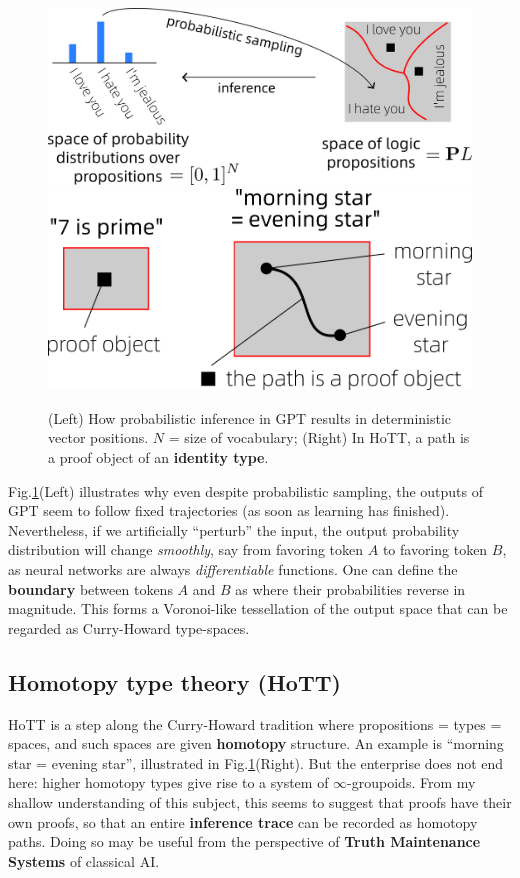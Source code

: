 \documentclass[runningheads]{llncs}
\begin{document}
\begin{figure}
	\includegraphics[scale=.45]{Transformer-output.png} \quad
	\includegraphics[scale=.35]{morning-star.png}
	\caption{(Left) How probabilistic inference in GPT results in deterministic vector positions. $N$ = size of vocabulary; (Right) In HoTT, a path is a proof object of an \textbf{identity type}.}
	\label{fig:morning-star}
\end{figure}

Fig.\ref{fig:morning-star}(Left) illustrates why even despite probabilistic sampling, the outputs of GPT seem to follow fixed trajectories (as soon as learning has finished).  Nevertheless, if we artificially ``perturb'' the input, the output probability distribution will change \textit{smoothly}, say from favoring token $A$ to favoring token $B$, as neural networks are always \textit{differentiable} functions.  One can define the \textbf{boundary} between tokens $A$ and $B$ as where their probabilities reverse in magnitude.  This forms a Voronoi-like tessellation of the output space that can be regarded as Curry-Howard type-spaces.

\subsection{Homotopy type theory (HoTT)}

HoTT is a step along the Curry-Howard tradition where propositions = types = spaces, and such spaces are given \textbf{homotopy} structure.  An example is ``morning star = evening star'', illustrated in Fig.\ref{fig:morning-star}(Right).  But the enterprise does not end here: higher homotopy types give rise to a system of $\infty$-groupoids.  From my shallow understanding of this subject, this seems to suggest that proofs have their own proofs, so that an entire \textbf{inference trace} can be recorded as homotopy paths.  Doing so may be useful from the perspective of \textbf{Truth Maintenance Systems} of classical AI.
\end{document}
